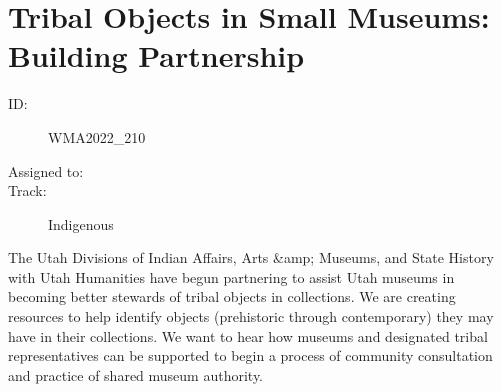 \documentclass{report}
\begin{document}
              

              
        
          \newpage
          \section{ Tribal Objects in Small Museums: Building Partnership }
            \begin{description}
              \item [ID:]
              WMA2022\_210

              \item [Assigned to:]
                \item [Track:]Indigenous~
              \end{description}

              The Utah Divisions of Indian Affairs, Arts \&amp; Museums, and State History with Utah Humanities have begun partnering to assist Utah museums in becoming better stewards of tribal objects in collections. We are creating resources to help identify objects (prehistoric through contemporary) they may have in their collections. We want to hear how museums and designated tribal representatives can be supported to begin a process of community consultation and practice of shared museum authority.
\end{document}

